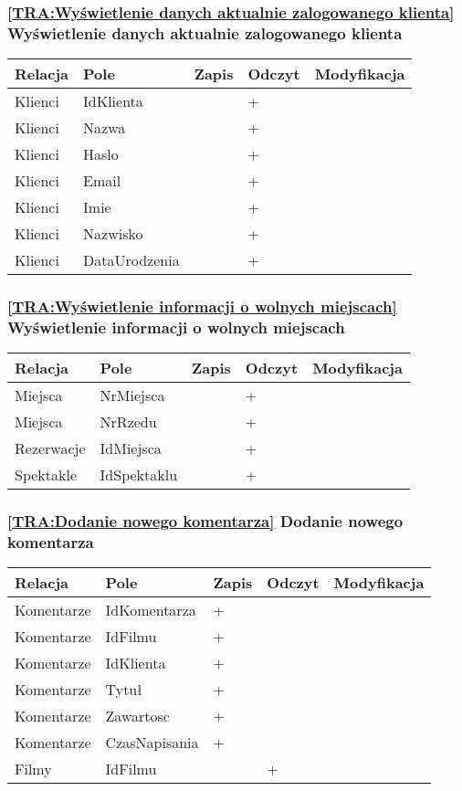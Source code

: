\subsubsection*{\ref{TRA:Wyświetlenie danych aktualnie zalogowanego klienta} Wyświetlenie danych aktualnie zalogowanego klienta}
\begin{tabularx}{\textwidth}{|Y|Y|Y|Y|Y|}\hline
Relacja & Pole & Zapis & Odczyt & Modyfikacja \\\hline
Klienci & IdKlienta &  & + & \\
Klienci & Nazwa &  & + & \\
Klienci & Haslo &  & + & \\
Klienci & Email &  & + & \\
Klienci & Imie &  & + & \\
Klienci & Nazwisko &  & + & \\
Klienci & DataUrodzenia &  & + & \\
\hline\end{tabularx}
\subsubsection*{\ref{TRA:Wyświetlenie informacji o wolnych miejscach} Wyświetlenie informacji o wolnych miejscach}
\begin{tabularx}{\textwidth}{|Y|Y|Y|Y|Y|}\hline
Relacja & Pole & Zapis & Odczyt & Modyfikacja \\\hline
Miejsca & NrMiejsca &  & + & \\
Miejsca & NrRzedu &  & + & \\
Rezerwacje & IdMiejsca &  & + & \\
Spektakle & IdSpektaklu &  & + & \\
\hline\end{tabularx}
\subsubsection*{\ref{TRA:Dodanie nowego komentarza} Dodanie nowego komentarza}
\begin{tabularx}{\textwidth}{|Y|Y|Y|Y|Y|}\hline
Relacja & Pole & Zapis & Odczyt & Modyfikacja \\\hline
Komentarze & IdKomentarza & + &  & \\
Komentarze & IdFilmu & + &  & \\
Komentarze & IdKlienta & + &  & \\
Komentarze & Tytuł & + &  & \\
Komentarze & Zawartosc & + &  & \\
Komentarze & CzasNapisania & + &  & \\
Filmy & IdFilmu &  & + & \\
\hline\end{tabularx}
